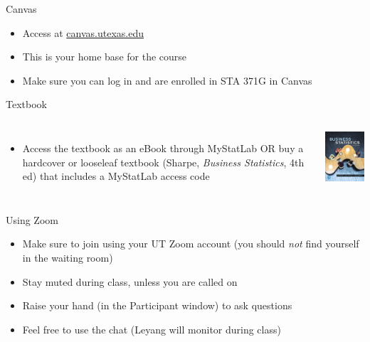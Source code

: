 \documentclass{beamer}\usepackage[]{graphicx}\usepackage[]{color}
\begin{document}
\begin{darkframes}
    \begin{frame}{Canvas}
      \begin{itemize}
        \item Access at \url{canvas.utexas.edu}
        \item This is your home base for the course
        \item Make sure you can log in and are enrolled in STA 371G in Canvas
      \end{itemize}
    \end{frame}


    \begin{frame}{Textbook}
      \begin{columns}[onlytextwidth]
        \begin{itemize}
          \item Access the textbook as an eBook through MyStatLab OR buy a hardcover or looseleaf textbook (Sharpe, \emph{Business Statistics}, 4th ed) that includes a MyStatLab access code
        \end{itemize}
          \includegraphics[width=1.5in]{textbook}
      \end{columns}
    \end{frame}


    \begin{frame}{Using Zoom}
      \begin{itemize}
        \item Make sure to join using your UT Zoom account (you should \emph{not} find yourself in the waiting room)
        \item Stay muted during class, unless you are called on
        \item Raise your hand (in the Participant window) to ask questions
        \item Feel free to use the chat (Leyang will monitor during class)
      \end{itemize}
    \end{frame}



\end{darkframes}
\end{document}
